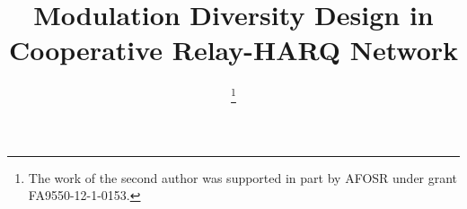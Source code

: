 \documentclass[journal,draftcls,onecolumn,12pt,twoside]{IEEEtran}
\begin{document}
%
\title{Modulation Diversity Design in Cooperative Relay-HARQ Network}


\author{
    \thanks{The work of the second author was supported in part by AFOSR under
    grant FA9550-12-1-0153.
    }%
}


% 
\end{document}
